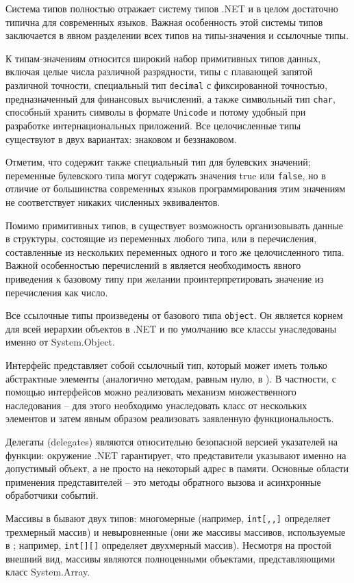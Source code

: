 Система типов \CSharp полностью отражает систему типов .NET и в целом достаточно типична для современных языков. Важная особенность этой системы типов заключается в явном
разделении всех типов на типы-значения и ссылочные типы.

К типам-значениям относится широкий набор примитивных типов данных, включая целые числа различной разрядности, типы с плавающей запятой различной точности, специальный тип \lstinline{decimal} с фиксированной точностью, предназначенный для финансовых вычислений, а также символьный тип \lstinline{char}, способный хранить символы в формате \lstinline{Unicode} и потому удобный при разработке интернациональных приложений. Все целочисленные типы существуют в двух вариантах: знаковом и беззнаковом.

Отметим, что \CSharp содержит также специальный тип для булевских значений; переменные булевского типа могут содержать значения true или \lstinline{false}, но в отличие от большинства современных языков программирования этим значениям не соответствует никаких численных эквивалентов.

Помимо примитивных типов, в \CSharp существует возможность организовывать данные в структуры, состоящие из переменных любого типа, или в перечисления, составленные из нескольких переменных одного и того же целочисленного типа. Важной особенностью перечислений в \CSharp является необходимость явного приведения к базовому типу при желании проинтерпретировать значение из перечисления как число.

Все ссылочные типы произведены от базового типа \lstinline{object}. Он является корнем для всей иерархии объектов в .NET и по умолчанию все классы унаследованы именно от System.Object.

Интерфейс представляет собой ссылочный тип, который может иметь только абстрактные элементы (аналогично методам, равным нулю, в \CPP). В частности, с помощью интерфейсов можно реализовать механизм множественного наследования -- для этого необходимо унаследовать класс от нескольких элементов и затем явным образом реализовать заявленную функциональность.

Делегаты (delegates) являются относительно безопасной версией указателей на функции: окружение .NET гарантирует, что представители указывают именно на допустимый объект, а не просто на некоторый адрес в памяти. Основные области применения представителей -- это методы обратного вызова и асинхронные обработчики событий.

Массивы в \CSharp бывают двух типов: многомерные (например, \lstinline{int[,,]} определяет трехмерный массив) и невыровненные (они же массивы массивов, используемые в \CPP; например, \lstinline{int[][]} определяет двухмерный массив). Несмотря на простой внешний вид, массивы являются полноценными объектами, представляющими класс System.Array.


